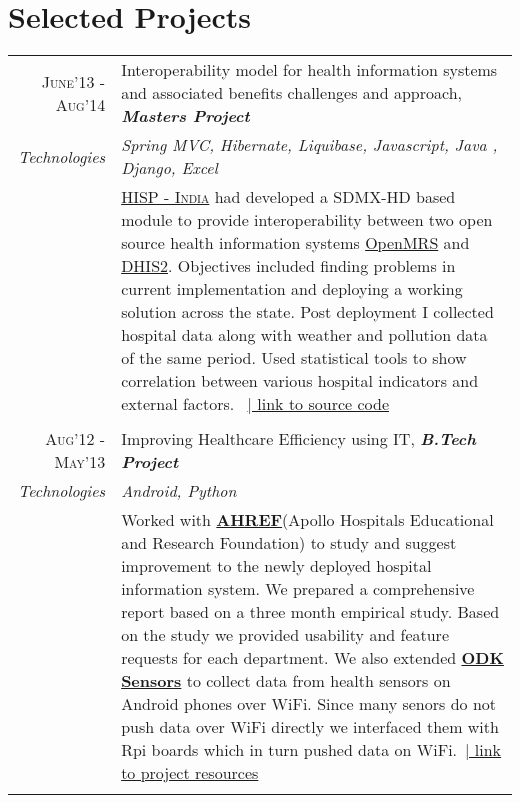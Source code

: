 \documentclass[a4paper,10pt]{article} %
\begin{document}
\section{\color{red} Selected Projects}

\begin{longtable}{r|p{13cm}}

\textsc{June'13 - Aug'14} & Interoperability model for health information systems and associated benefits challenges and approach, \emph\textbf{Masters Project}\\
\emph{Technologies} & \emph{Spring MVC, Hibernate, Liquibase, Javascript, Java , Django, Excel}\\ 
& \small{\href{http://hispindia.org/}{\textsc{HISP - India}} had developed a SDMX-HD based module to provide interoperability between two open source health information systems \href{http://openmrs.org/}{OpenMRS} and \href{https://www.dhis2.org/}{DHIS2}. Objectives included finding problems in current implementation and deploying a working solution across the state. Post deployment I collected hospital data along with weather and pollution data of the same period. Used statistical tools to show correlation between various hospital indicators and external factors.} \ \href{https://github.com/hispindia/dhisreport}{\hfill | link to source code}\\
\multicolumn{2}{c}{} \\


\textsc{Aug'12 - May'13} & Improving Healthcare Efficiency using IT, \emph\textbf{B.Tech Project}\\
\emph{Technologies} & \emph{Android, Python}\\ 
& \small{ Worked with \href{http://www.aherf.org/}{\textbf{AHREF}}(Apollo Hospitals Educational and Research Foundation) to study and
suggest improvement to the newly deployed hospital information system.  We prepared a
comprehensive report based on a three month empirical study. Based on the study we
provided usability and feature requests for each department. We also extended \href{https://opendatakit.org/use/sensors/}{\textbf{ODK Sensors}} to collect data from health sensors on Android phones over WiFi.  Since many senors do not push
data over WiFi directly we interfaced them with Rpi boards which in turn pushed data on
WiFi.}\ \href{https://sites.google.com/a/iiitd.ac.in/apurvmehra/projects}{\hfill | link to project resources}\\
\multicolumn{2}{c}{} \\


\end{longtable}
\end{document}
